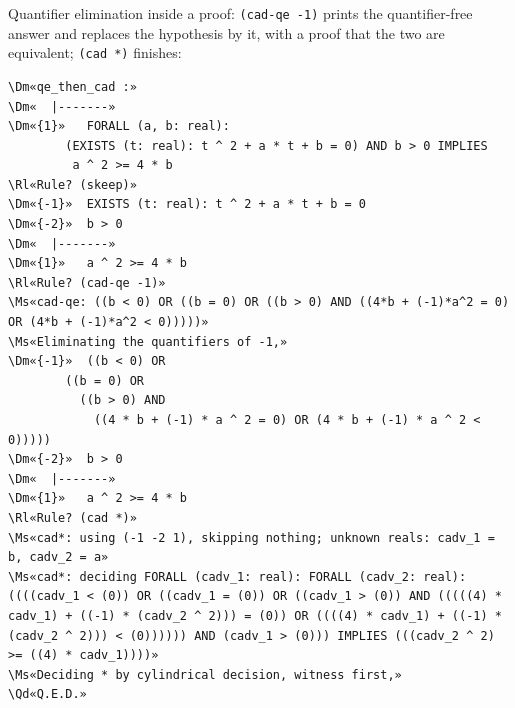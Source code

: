 \documentclass[11pt]{article}
\newcommand\Rl[1]{\textcolor{accent}{\textbf{#1}}}
\newcommand\Ms[1]{\textcolor{moss}{\textbf{#1}}}
\newcommand\Dm[1]{\textcolor{muted}{#1}}
\newcommand\Qd[1]{\colorbox{mosssoft}{\textcolor{moss}{\textbf{#1}}}}
\begin{document}
Quantifier elimination inside a proof: \texttt{(cad-qe -1)} prints the quantifier-free answer and replaces the
hypothesis by it, with a proof that the two are equivalent; \texttt{(cad *)} finishes:
\begin{termbox}
\begin{Verbatim}[commandchars=\\«», fontsize=\footnotesize]
\Dm«qe_then_cad :»
\Dm«  |-------»
\Dm«{1}»   FORALL (a, b: real):
        (EXISTS (t: real): t ^ 2 + a * t + b = 0) AND b > 0 IMPLIES
         a ^ 2 >= 4 * b
\Rl«Rule? (skeep)»
\Dm«{-1}»  EXISTS (t: real): t ^ 2 + a * t + b = 0
\Dm«{-2}»  b > 0
\Dm«  |-------»
\Dm«{1}»   a ^ 2 >= 4 * b
\Rl«Rule? (cad-qe -1)»
\Ms«cad-qe: ((b < 0) OR ((b = 0) OR ((b > 0) AND ((4*b + (-1)*a^2 = 0) OR (4*b + (-1)*a^2 < 0)))))»
\Ms«Eliminating the quantifiers of -1,»
\Dm«{-1}»  ((b < 0) OR
        ((b = 0) OR
          ((b > 0) AND
            ((4 * b + (-1) * a ^ 2 = 0) OR (4 * b + (-1) * a ^ 2 < 0)))))
\Dm«{-2}»  b > 0
\Dm«  |-------»
\Dm«{1}»   a ^ 2 >= 4 * b
\Rl«Rule? (cad *)»
\Ms«cad*: using (-1 -2 1), skipping nothing; unknown reals: cadv_1 = b, cadv_2 = a»
\Ms«cad*: deciding FORALL (cadv_1: real): FORALL (cadv_2: real): ((((cadv_1 < (0)) OR ((cadv_1 = (0)) OR ((cadv_1 > (0)) AND (((((4) * cadv_1) + ((-1) * (cadv_2 ^ 2))) = (0)) OR ((((4) * cadv_1) + ((-1) * (cadv_2 ^ 2))) < (0)))))) AND (cadv_1 > (0))) IMPLIES (((cadv_2 ^ 2) >= ((4) * cadv_1))))»
\Ms«Deciding * by cylindrical decision, witness first,»
\Qd«Q.E.D.»
\end{Verbatim}
\end{termbox}
\end{document}
